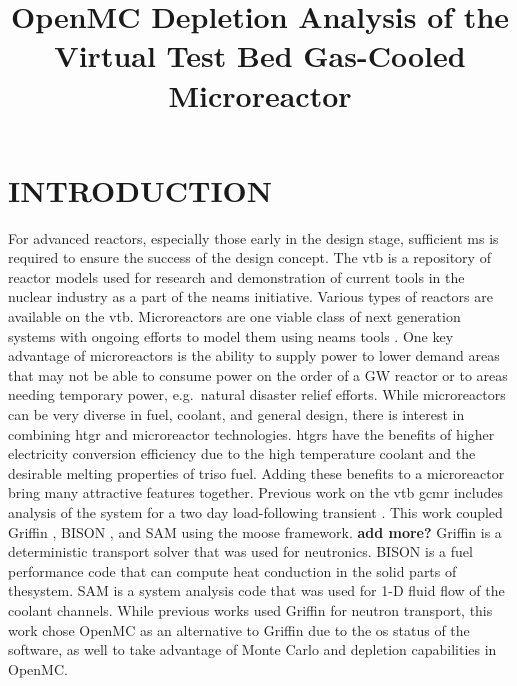 \documentclass[letterpaper]{physor2024}
\title{OpenMC Depletion Analysis of the Virtual Test Bed Gas-Cooled Microreactor}
\begin{document}
\section{INTRODUCTION}\label{sec:intro}
For advanced reactors, especially those early in the design stage, sufficient \gls{ms} is required to ensure the success of the design concept. The \gls{vtb} \cite{vtb2023} is a repository of reactor models used for research and demonstration of current tools in the nuclear industry as a part of the \gls{neams} initiative. Various types of reactors are available on the \gls{vtb}. Microreactors are one viable class of next generation systems with ongoing efforts to model them using \gls{neams} tools \cite{Stauff-preliminary-applications-2021, Stauff-applications-2022}. One key advantage of microreactors is the ability to supply power to lower demand areas that may not be able to consume power on the order of a GW reactor or to areas needing temporary power, e.g.~natural disaster relief efforts. While microreactors can be very diverse in fuel, coolant, and general design, there is interest in combining \gls{htgr} and microreactor technologies. \glspl{htgr} have the benefits of higher electricity conversion efficiency due to the high temperature coolant and the desirable melting properties of \gls{triso} fuel. Adding these benefits to a microreactor bring many attractive features together. Previous work on the \gls{vtb} \gls{gcmr} includes analysis of the system for a two day load-following transient \cite{Abdelhameed-ANS-2022}. This work coupled Griffin \cite{GRIFFIN}, BISON \cite{BISON}, and SAM \cite{SAM} using the \gls{moose} framework. \textbf{add more?} Griffin is a deterministic transport solver that was used for neutronics. BISON is a fuel performance code that can compute heat conduction in the solid parts of thesystem. SAM is a system analysis code that was used for 1-D fluid flow of the coolant channels. While previous works used Griffin for neutron transport, this work chose OpenMC as an alternative to Griffin due to the \gls{os} status of the software, as well to take advantage of Monte Carlo and depletion capabilities in OpenMC.




\end{document}

